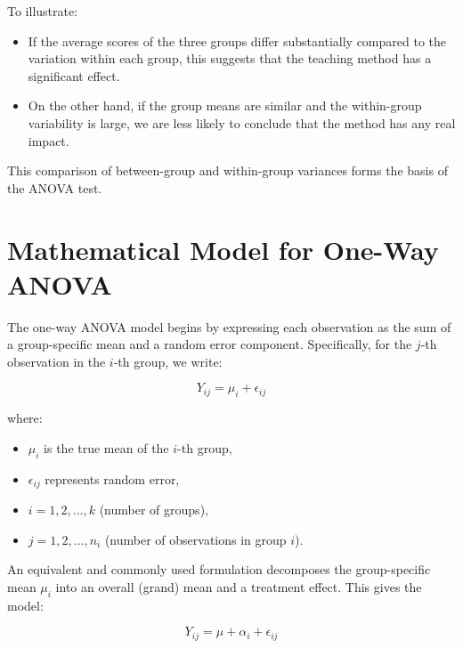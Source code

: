 \documentclass[twoside]{book}
\begin{document}
\medskip
\noindent To illustrate:
\begin{itemize}
  \item If the average scores of the three groups differ substantially compared to the variation within each group, this suggests that the teaching method has a significant effect.
  \item On the other hand, if the group means are similar and the within-group variability is large, we are less likely to conclude that the method has any real impact.
\end{itemize}

\noindent This comparison of between-group and within-group variances forms the basis of the ANOVA test.


\section{Mathematical Model for One-Way ANOVA}

The one-way ANOVA model begins by expressing each observation as the sum of a group-specific mean and a random error component. Specifically, for the \( j \)-th observation in the \( i \)-th group, we write:

\begin{textbox}
\begin{equation*}
Y_{ij} = \mu_i + \epsilon_{ij}
\end{equation*}
\end{textbox}

where:
\begin{itemize}
    \item \( \mu_i \) is the true mean of the \( i \)-th group,
    \item \( \epsilon_{ij}\) represents random error,
    \item \( i = 1, 2, \ldots, k \) (number of groups),
    \item \( j = 1, 2, \ldots, n_i \) (number of observations in group \( i \)).
\end{itemize}

An equivalent and commonly used formulation decomposes the group-specific mean \( \mu_i \) into an overall (grand) mean and a treatment effect. This gives the model:

\begin{textbox}
\begin{equation*}
Y_{ij} = \mu + \alpha_i + \epsilon_{ij}
\end{equation*}
\end{textbox}
\end{document}
